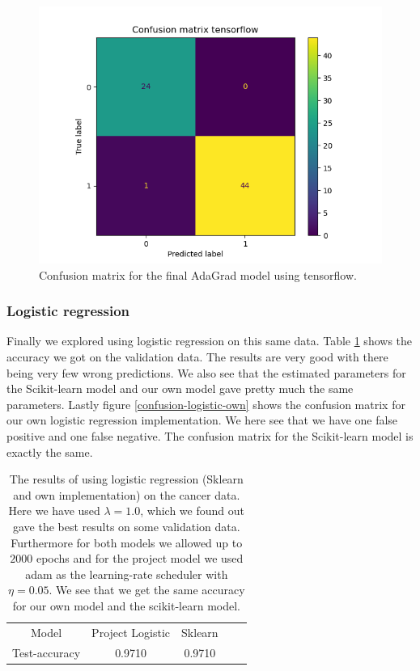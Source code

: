 \documentclass{article}
\begin{document}
\begin{figure}
      \centering
      \includegraphics[scale=0.8]{confusion_matrix_tensorflow}
      \caption{Confusion matrix for the final AdaGrad model using tensorflow.}
      \label{confusion-nn-tf}
\end{figure}


\subsubsection{Logistic regression}
Finally we explored using logistic regression on this same data. Table
\ref{breastcancer-logistic-results} shows the accuracy we got on the validation
data. The results are very good with there being very few wrong predictions. We
also see that the estimated parameters for the Scikit-learn model and our own
model gave pretty much the same parameters. Lastly figure
\ref{confusion-logistic-own} shows the confusion matrix for our own logistic
regression implementation. We here see that we have one false positive and one
false negative. The confusion matrix for the Scikit-learn model is exactly the same.

\begin{table}
      \centering
      \begin{tabular}{| c | c | c | c | c |}
            Model         & Project Logistic & Sklearn \\
            Test-accuracy & 0.9710           & 0.9710  \\
      \end{tabular}
      \caption{The results of using logistic regression (Sklearn and own
            implementation) on the cancer data. Here we have used $\lambda = 1.0$,
            which we found out gave the best results on some validation data.
            Furthermore for both models we allowed up to $2000$ epochs and for
            the project model we used adam as the learning-rate scheduler with
            $\eta = 0.05$. We see that we get the same accuracy for our own
            model and the scikit-learn model.}
      \label{breastcancer-logistic-results}
\end{table}
\end{document}
